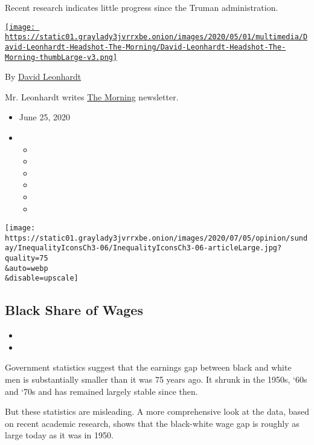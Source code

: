 Recent research indicates little progress since the Truman
administration.

\href{https://www.nytimes3xbfgragh.onion/by/david-leonhardt}{\texttt{[image: https://static01.graylady3jvrrxbe.onion/images/2020/05/01/multimedia/David-Leonhardt-Headshot-The-Morning/David-Leonhardt-Headshot-The-Morning-thumbLarge-v3.png]}}

By \href{https://www.nytimes3xbfgragh.onion/by/david-leonhardt}{David
Leonhardt}

Mr. Leonhardt writes
\href{https://www.nytimes3xbfgragh.onion/series/us-morning-briefing}{The
Morning} newsletter.

\begin{itemize}
\item
  June 25, 2020
\item
  \begin{itemize}
  \item
  \item
  \item
  \item
  \item
  \item
  \end{itemize}
\end{itemize}

\texttt{[image: https://static01.graylady3jvrrxbe.onion/images/2020/07/05/opinion/sunday/InequalityIconsCh3-06/InequalityIconsCh3-06-articleLarge.jpg?quality=75\\\&auto=webp\\\&disable=upscale]}

\hypertarget{black-share-of-wages}{%
\subsection{Black Share of Wages}\label{black-share-of-wages}}

\begin{itemize}
\item
\item
\end{itemize}

Government statistics suggest that the earnings gap between black and
white men is substantially smaller than it was 75 years ago. It shrunk
in the 1950s, `60s and `70s and has remained largely stable since then.

But these statistics are misleading. A more comprehensive look at the
data, based on recent academic research, shows that the black-white wage
gap is roughly as large today as it was in 1950.

